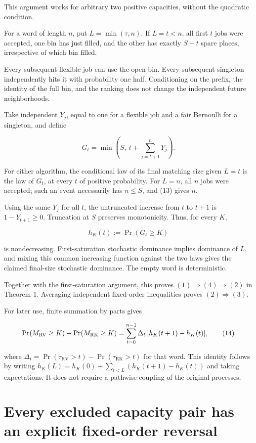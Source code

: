 This argument works for arbitrary two positive capacities, without the quadratic condition.

For a word of length \(n\), put \(L=\min(\tau,n)\). If \(L=t<n\), all first \(t\) jobs were accepted, one bin has just filled, and the other has exactly \(S-t\) spare places, irrespective of which bin filled.

Every subsequent flexible job can use the open bin. Every subsequent singleton independently hits it with probability one half. Conditioning on the prefix, the identity of the full bin, and the ranking does not change the independent future neighborhoods.

Take independent \(Y_j\), equal to one for a flexible job and a fair Bernoulli for a singleton, and define

\[
G_t=\min\left(S,\ t+\sum_{j=t+1}^{n}Y_j\right).\tag{13}
\]

For either algorithm, the conditional law of its final matching size given \(L=t\) is the law of \(G_t\), at every \(t\) of positive probability. For \(L=n\), all \(n\) jobs were accepted; such an event necessarily has \(n\le S\), and (13) gives \(n\).

Using the same \(Y_j\) for all \(t\), the untruncated increase from \(t\) to \(t+1\) is \(1-Y_{t+1}\ge 0\). Truncation at \(S\) preserves monotonicity. Thus, for every \(K\),

\[
h_K(t):=\Pr(G_t\ge K)
\]

is nondecreasing. First-saturation stochastic dominance implies dominance of \(L\), and mixing this common increasing function against the two laws gives the claimed final-size stochastic dominance. The empty word is deterministic.

Together with the first-saturation argument, this proves \((1) \Rightarrow  (4) \Rightarrow  (2)\) in Theorem 1. Averaging independent fixed-order inequalities proves \((2) \Rightarrow  (3)\).

For later use, finite summation by parts gives

\[
\Pr(M_{\rm RV}\ge K)-\Pr(M_{\rm RK}\ge K)
=
\sum_{t=0}^{n-1}\Delta_t\,[h_K(t+1)-h_K(t)],\tag{14}
\]

where \(\Delta_t=\Pr(\tau_{\mathrm{RV}}>t)-\Pr(\tau_{\mathrm{RK}}>t)\) for that word. This identity follows by writing \(h_K(L)=h_K(0)+\sum_{t<L}(h_K(t+1)-h_K(t))\) and taking expectations. It does not require a pathwise coupling of the original processes.

\section{Every excluded capacity pair has an explicit fixed-order reversal}\label{every-excluded-capacity-pair-has-an-explicit-fixed-order-reversal}

